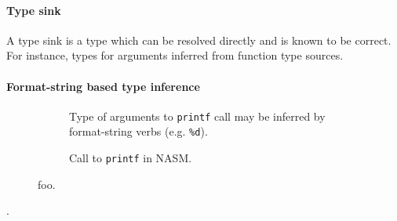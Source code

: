 
\paragraph{Type sink}

A type sink is a type which can be resolved directly and is known to be correct. For instance, types for arguments inferred from function type sources.


\paragraph{Format-string based type inference}


\begin{figure}[htbp]
	\centering
	\begin{subfigure}[ht]{0.50\textwidth}
		\centering
		
		\caption{Type of arguments to \texttt{printf} call may be inferred by format-string verbs (e.g. \texttt{\%d}).}
		\label{fig:format_string_c}
	\end{subfigure}
	\begin{subfigure}[ht]{0.50\textwidth}
		\centering
		
		\caption{Call to \texttt{printf} in NASM.}
		\label{fig:format_string_asm}
	\end{subfigure}
	\caption{foo.}
\end{figure}

.
